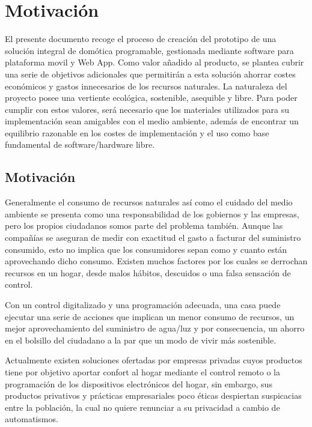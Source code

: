 \cleardoublepage

\chapter{Motivación}

\label{makereference}
El presente documento recoge el proceso de creación del prototipo de una solución integral de domótica programable, gestionada mediante software para plataforma movil y Web App. Como valor añadido al producto, se plantea cubrir una serie de objetivos adicionales que permitirán a esta solución ahorrar costes económicos y gastos innecesarios de los recursos naturales. La naturaleza del proyecto posee una vertiente ecológica, sostenible, asequible y libre. Para poder cumplir con estos valores, será necesario que los materiales utilizados para su implementación sean amigables con el medio ambiente, además de encontrar un equilibrio razonable en los costes de implementación y el uso como base fundamental de software/hardware libre.

\section{Motivación}
\label{makereference1.1}

Generalmente el consumo de recursos naturales así como el cuidado del medio ambiente se presenta como una responsabilidad de los gobiernos y las empresas, pero los propios ciudadanos somos parte del problema también. Aunque las compañías se aseguran de medir con exactitud el gasto a facturar del suministro consumido, esto no implica que los consumidores sepan como y cuanto están aprovechando dicho consumo. Existen muchos factores por los cuales se derrochan recursos en un hogar, desde malos hábitos, descuidos o una falsa sensación de control.

Con un control digitalizado y una programación adecuada, una casa puede ejecutar una serie de acciones que implican un menor consumo de recursos, un mejor aprovechamiento del suministro de agua/luz y por consecuencia, un ahorro en el bolsillo del ciudadano a la par que un modo de vivir más sostenible.

Actualmente existen soluciones ofertadas por empresas privadas cuyos productos tiene por objetivo aportar confort al hogar mediante el control remoto o la programación de los dispositivos electrónicos del hogar, sin embargo, sus productos privativos y prácticas empresariales poco éticas despiertan suspicacias entre la población, la cual no quiere renunciar  a su privacidad a cambio de automatismos.

